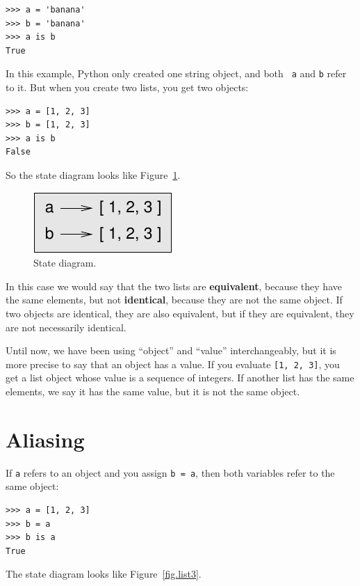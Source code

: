 \documentclass[10pt]{book}
\begin{document}
\begin{verbatim}
>>> a = 'banana'
>>> b = 'banana'
>>> a is b
True
\end{verbatim}
%
In this example, Python only created one string object, and both {\tt
  a} and {\tt b} refer to it.  But when you create two lists, you get
two objects:

\begin{verbatim}
>>> a = [1, 2, 3]
>>> b = [1, 2, 3]
>>> a is b
False
\end{verbatim}
%
So the state diagram looks like Figure~\ref{fig.list2}.

\begin{figure}
\centerline
{\includegraphics[scale=0.8]{figs/list2.pdf}}
\caption{State diagram.}
\label{fig.list2}
\end{figure}

In this case we would say that the two lists are {\bf equivalent},
because they have the same elements, but not {\bf identical}, because
they are not the same object.  If two objects are identical, they are
also equivalent, but if they are equivalent, they are not necessarily
identical.

Until now, we have been using ``object'' and ``value''
interchangeably, but it is more precise to say that an object has a
value.  If you evaluate {\tt [1, 2, 3]}, you get a list
object whose value is a sequence of integers.  If another
list has the same elements, we say it has the same value, but
it is not the same object.


\section{Aliasing}

If {\tt a} refers to an object and you assign {\tt b = a},
then both variables refer to the same object:

\begin{verbatim}
>>> a = [1, 2, 3]
>>> b = a
>>> b is a
True
\end{verbatim}
%
The state diagram looks like Figure~\ref{fig.list3}.
\end{document}
